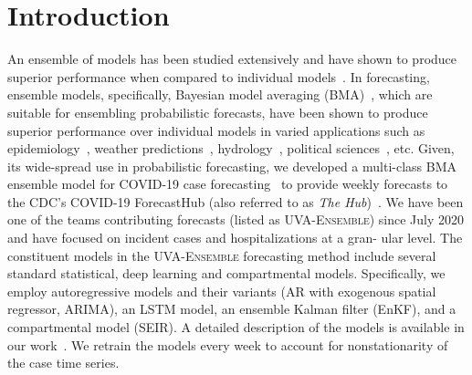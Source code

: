 \documentclass[conference,compsoc]{IEEEtran}
\newcommand{\hub}{\emph{The Hub}}
\begin{document}
\section{Introduction}
An ensemble of models has been studied extensively and have shown to produce superior performance when compared to individual models~\cite{sagi2018ensemble}. In forecasting, ensemble models, specifically, Bayesian model averaging (BMA)~\cite{raftery2005using}, which are suitable for ensembling probabilistic forecasts, have been shown to produce superior performance over individual models in varied applications such as  epidemiology~\cite{yamana2016superensemble,reich2019collaborative,cramer2022evaluation}, weather predictions~\cite{raftery2005using}, hydrology~\cite{duan2007multi}, political sciences~\cite{montgomery2012improving}, etc. Given, its wide-spread use in probabilistic forecasting, we developed a multi-class BMA ensemble model for COVID-19 case forecasting~\cite{allmodels} to provide weekly forecasts to the CDC's COVID-19 ForecastHub (also referred to as \hub{})~\cite{Cramer2021-hub-dataset}. We have been one of
the teams contributing forecasts (listed as \textsc{UVA-Ensemble}) since July 2020 and have focused on incident cases and hospitalizations at a gran-
ular level. The constituent models in the \textsc{UVA-Ensemble} forecasting method include several standard statistical, deep learning and compartmental models. Specifically, we employ autoregressive models and their variants (AR with exogenous spatial regressor, ARIMA), an LSTM model, an ensemble Kalman filter (EnKF), and a compartmental model (SEIR). A detailed description of the models is available in our work~\cite{allmodels}. We retrain the models every week to account for nonstationarity of the case time series.  
\end{document}

